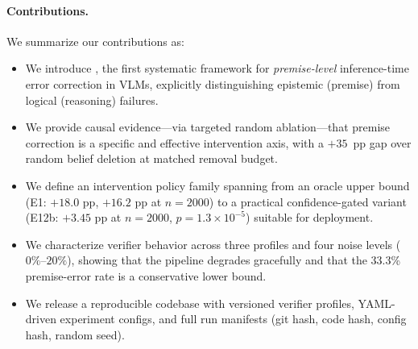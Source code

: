 \paragraph{Contributions.} We summarize our contributions as:
\begin{itemize}[leftmargin=1.5em,itemsep=1pt,topsep=2pt]
  \item We introduce \bci{}, the first systematic framework for \emph{premise-level}
    inference-time error correction in VLMs, explicitly distinguishing epistemic
    (premise) from logical (reasoning) failures.
  \item We provide causal evidence---via targeted \vs random ablation---that premise
    correction is a specific and effective intervention axis, with a $+35$~pp gap
    over random belief deletion at matched removal budget.
  \item We define an intervention policy family spanning from an oracle upper bound
    (E1: $+18.0$ pp, $+16.2$ pp at $n{=}2000$) to a practical confidence-gated
    variant (E12b: $+3.45$ pp at $n{=}2000$, $p{=}1.3{\times}10^{-5}$) suitable
    for deployment.
  \item We characterize verifier behavior across three profiles and four noise
    levels ($0\%$--$20\%$), showing that the pipeline degrades gracefully and that
    the 33.3\% premise-error rate is a conservative lower bound.
  \item We release a reproducible codebase with versioned verifier profiles,
    YAML-driven experiment configs, and full run manifests (git hash, code hash,
    config hash, random seed).
\end{itemize}
